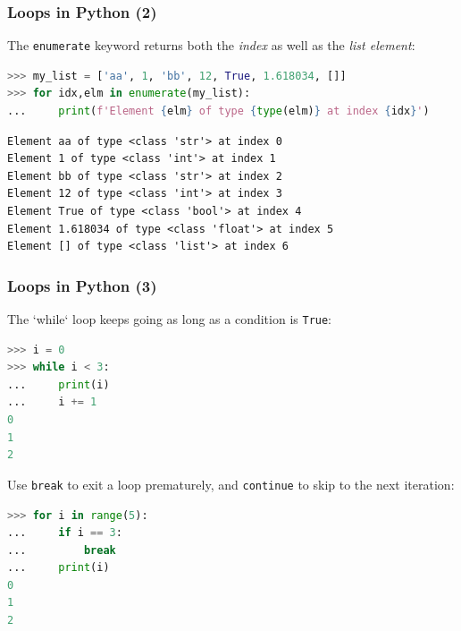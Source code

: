 \begin{frame}[fragile]
  \frametitle{Loops in Python (2)}
  The \lstinline|enumerate| keyword returns both the \emph{index} as well as the \emph{list element}:
  \begin{lstlisting}[language=Python,numbers=none]
>>> my_list = ['aa', 1, 'bb', 12, True, 1.618034, []]
>>> for idx,elm in enumerate(my_list):
...     print(f'Element {elm} of type {type(elm)} at index {idx}')
  \end{lstlisting}
  \pause
  \begin{lstlisting}[style=PyOutput]
Element aa of type <class 'str'> at index 0
Element 1 of type <class 'int'> at index 1
Element bb of type <class 'str'> at index 2
Element 12 of type <class 'int'> at index 3
Element True of type <class 'bool'> at index 4
Element 1.618034 of type <class 'float'> at index 5
Element [] of type <class 'list'> at index 6
  \end{lstlisting}
\end{frame}

\begin{frame}[fragile]
  \frametitle{Loops in Python (3)}
  The `while` loop keeps going as long as a condition is \lstinline{True}:
  \begin{lstlisting}[language=Python,numbers=none]
>>> i = 0
>>> while i < 3:
...     print(i)
...     i += 1
0
1
2
  \end{lstlisting}\pause
  Use \lstinline|break| to exit a loop prematurely, and \lstinline|continue| to skip to the next iteration:
  \begin{lstlisting}[language=Python,numbers=none]
>>> for i in range(5):
...     if i == 3:
...         break
...     print(i)
0
1
2
  \end{lstlisting}
\end{frame}

